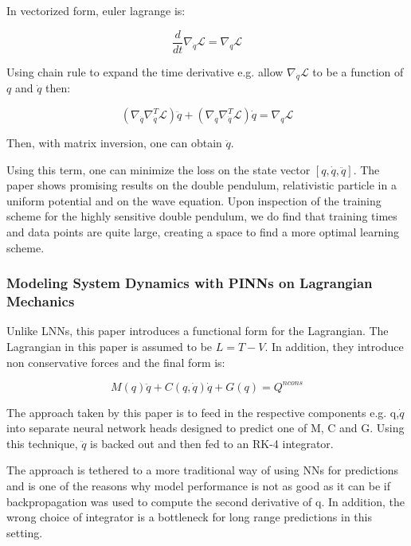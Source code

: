 \documentclass{article}
\begin{document}
In vectorized form, euler lagrange is:

\begin{equation}
\frac{d}{dt} \nabla_{\dot{q}} \mathcal{L} = \nabla_q \mathcal{L}
\label{eqn.lnn1}
\end{equation}

Using chain rule to expand the time derivative e.g. allow $\nabla_{\dot{q}}\mathcal{L}$ to be a function of $q$ and $\dot{q}$ then:

\begin{equation}
(\nabla_{\dot{q}}\nabla_{\dot{q}}^T \mathcal{L}) \ddot{q} + (\nabla_q \nabla_{\dot{q}}^T \mathcal{L})\dot{q} = \nabla_q \mathcal{L}
\end{equation}

Then, with matrix inversion, one can obtain $\ddot{q}$. 

Using this term, one can minimize the loss on the state vector $[q,\dot{q},\ddot{q}]$. The paper shows promising results on the double pendulum, relativistic particle in a uniform potential and on the wave equation. Upon inspection of the training scheme for the highly sensitive double pendulum, we do find that training times and data points are quite large, creating a space to find a more optimal learning scheme.

\subsubsection{Modeling System Dynamics with PINNs on Lagrangian Mechanics}

Unlike LNNs, this paper introduces a functional form for the Lagrangian. The Lagrangian in this paper \cite{roehrl_modeling_2020} is assumed to be $L = T -V$. In addition, they introduce non conservative forces and the final form is:

$$ M(q) \ddot{q} + C(q,\dot{q})\dot{q} + G(q) = Q^{ncons} $$

The approach taken by this paper is to feed in the respective components e.g. q,$\dot{q}$ into separate neural network heads designed to predict one of M, C and G. Using this technique, $\ddot{q}$ is backed out and then fed to an RK-4 integrator.

The approach is tethered to a more traditional way of using NNs for predictions and is one of the reasons why model performance is not as good as it can be if backpropagation was used to compute the second derivative of q. In addition, the wrong choice of integrator is a bottleneck for long range predictions in this setting.
\end{document}
